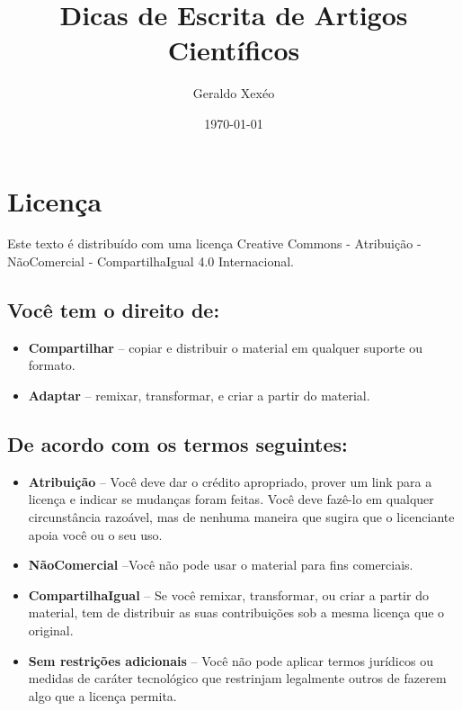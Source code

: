 \documentclass[openany]{book}
\title{Dicas de Escrita de Artigos Científicos}
\author{Geraldo Xexéo}
\date{\today}
\begin{document}
\frontmatter

\maketitle

\tableofcontents



\chapter*{Licença}

\begin{center}
\ccbyncsa

\vspace{1cm}

Este texto é distribuído com uma licença Creative Commons - Atribuição - NãoComercial - CompartilhaIgual 4.0 Internacional.

\end{center}






\section*{Você tem o direito de:}
\begin{itemize}
\item \textbf{Compartilhar} -- copiar e distribuir o material em qualquer suporte ou formato.
\item \textbf{Adaptar} -- remixar, transformar, e criar a partir do material.
\end{itemize}

\section*{De acordo com os termos seguintes:}
\begin{itemize}
\item \textbf{Atribuição} -- Você deve dar o crédito apropriado, prover um link para a licença e indicar se mudanças foram feitas. Você deve fazê-lo em qualquer circunstância razoável, mas de nenhuma maneira que sugira que o licenciante apoia você ou o seu uso.
\item \textbf{NãoComercial} --Você não pode usar o material para fins comerciais.
\item \textbf{CompartilhaIgual} -- Se você remixar, transformar, ou criar a partir do material, tem de distribuir as suas contribuições sob a mesma licença que o original.
\item \textbf{Sem restrições adicionais} -- Você não pode aplicar termos jurídicos ou medidas de caráter tecnológico que restrinjam legalmente outros de fazerem algo que a licença permita.
\end{itemize}
\end{document}
